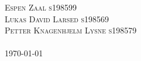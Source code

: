 
\vfill %


{\centering \large 
\hfill \textsc{Espen Zaal s198599} \\
\hfill \textsc{Lukas David Larsed s198569} \\
\hfill \textsc{Petter Knagenhjelm Lysne s198579} \\



\HRule{1pt}} %
\\
		\today


\clearpage %
